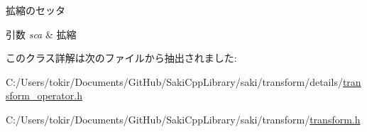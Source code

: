 拡縮のセッタ 


\begin{DoxyParams}{引数}
{\em sca} & 拡縮 \\
\hline
\end{DoxyParams}


このクラス詳解は次のファイルから抽出されました\+:\begin{DoxyCompactItemize}
\item 
C\+:/\+Users/tokir/\+Documents/\+Git\+Hub/\+Saki\+Cpp\+Library/saki/transform/details/\mbox{\hyperlink{transform__operator_8h}{transform\+\_\+operator.\+h}}\item 
C\+:/\+Users/tokir/\+Documents/\+Git\+Hub/\+Saki\+Cpp\+Library/saki/transform/\mbox{\hyperlink{transform_2transform_8h}{transform.\+h}}\end{DoxyCompactItemize}
